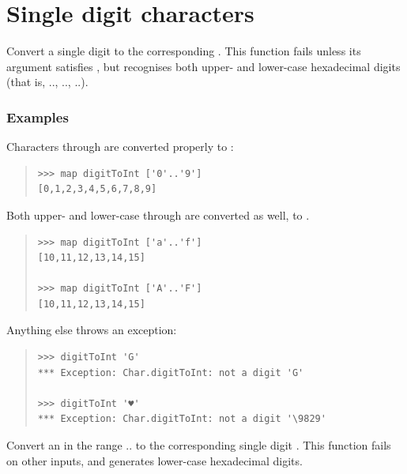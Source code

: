 \section{Single digit characters}
\begin{haddockdesc}
\item[\begin{tabular}{@{}l}
digitToInt :: Char -> Int
\end{tabular}]
{\haddockbegindoc
Convert a single digit  to the corresponding .  This
 function fails unless its argument satisfies , but
 recognises both upper- and lower-case hexadecimal digits (that
 is, .., .., ..).\par
\subsubsection*{\textbf{Examples}}
Characters  through  are converted properly to
 :\par
\begin{quote}
{\haddockverb\begin{verbatim}
>>> map digitToInt ['0'..'9']
[0,1,2,3,4,5,6,7,8,9]

\end{verbatim}}
\end{quote}
Both upper- and lower-case  through  are converted
 as well, to .\par
\begin{quote}
{\haddockverb\begin{verbatim}
>>> map digitToInt ['a'..'f']
[10,11,12,13,14,15]

>>> map digitToInt ['A'..'F']
[10,11,12,13,14,15]

\end{verbatim}}
\end{quote}
Anything else throws an exception:\par
\begin{quote}
{\haddockverb\begin{verbatim}
>>> digitToInt 'G'
*** Exception: Char.digitToInt: not a digit 'G'

>>> digitToInt '♥'
*** Exception: Char.digitToInt: not a digit '\9829'

\end{verbatim}}
\end{quote}}
\end{haddockdesc}
\begin{haddockdesc}
\item[\begin{tabular}{@{}l}
intToDigit :: Int -> Char
\end{tabular}]
{\haddockbegindoc
Convert an  in the range .. to the corresponding single
 digit .  This function fails on other inputs, and generates
 lower-case hexadecimal digits.\par}
\end{haddockdesc}
